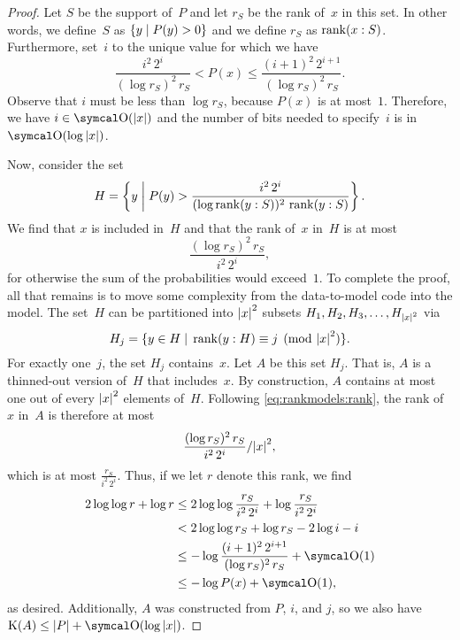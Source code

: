 \begin{proof}
  Let $S$ be the support of~$P$ and let $r_S$ be the rank of~$x$ in this set.
  In other words, we define~$S$ as $\{y \st P(y) > 0\}$ and we define $r_S$ as $\rank(x : S)$.
  Furthermore, set~$i$ to the unique value for which we have
  \begin{equation*}
    \frac{i^2\, 2^i}{(\log r_S)^2\, r_S} < P(x) \le \frac{(i + 1)^2\, 2^{i + 1}}{(\log r_S)^2\, r_S}.
  \end{equation*}
  Observe that $i$ must be less than $\log r_S$, because $P(x)$ is at most~$1$.
  Therefore, we have $i \in \bigO(\length{x})$ and the number of bits needed to specify~$i$ is in $\bigO(\log \length{x})$.

  Now, consider the set
  \begin{equation*}
    H \deq \left\{y \st[\middle] P(y) > \frac{i^2\, 2^i}{(\log \rank(y : S))^2\, \rank(y : S)}\right\}.
  \end{equation*}
  We find that $x$ is included in~$H$ and that the rank of~$x$ in~$H$ is at most
  \begin{equation}
  \label{eq:rankmodels:rank}
    \frac{(\log r_S)^2\, r_S}{i^2\, 2^i},
  \end{equation}
  for otherwise the sum of the probabilities would exceed~$1$.
  To complete the proof, all that remains is to move some complexity from the data-to-model code into the model.
  The set~$H$ can be partitioned into $\length{x}^2$ subsets $H_1, H_2, H_3, \ldots, H_{\length{x}^2}$ via
  \begin{equation*}
    H_j \deq \{y \in H \st \rank(y : H) \equiv j \pmod{\length{x}^2}\}.
  \end{equation*}
  For exactly one~$j$, the set $H_j$ contains~$x$.
  Let $A$ be this set $H_j$.
  That is, $A$ is a thinned-out version of~$H$ that includes~$x$.
  By construction, $A$ contains at most one out of every $\length{x}^2$ elements of~$H$.
  Following \eqref{eq:rankmodels:rank}, the rank of~$x$ in~$A$ is therefore at most
  \begin{equation*}
    \frac{(\log r_S)^2\, r_S}{i^2\, 2^i} / \length{x}^2,
  \end{equation*}
  which is at most $\frac{r_S}{i^2\, 2^i}$.
  Thus, if we let $r$ denote this rank, we find
  \begin{align*}
    2 \log \log r + \log r &\le 2 \log \log \frac{r_S}{i^2\, 2^i} + \log \frac{r_S}{i^2\, 2^i} \\
    	&< 2 \log \log r_S + \log r_S - 2 \log i - i \\
    	&\le -\log \frac{(i + 1)^2\, 2^{i + 1}}{(\log r_S)^2\, r_S} + \bigO(1) \\
    	&\le -\log P(x) + \bigO(1),
  \end{align*}
  as desired.
  Additionally, $A$ was constructed from $P$, $i$, and $j$, so we also have $\KC(A) \le \length{P} + \bigO(\log \length{x})$.
\end{proof}

